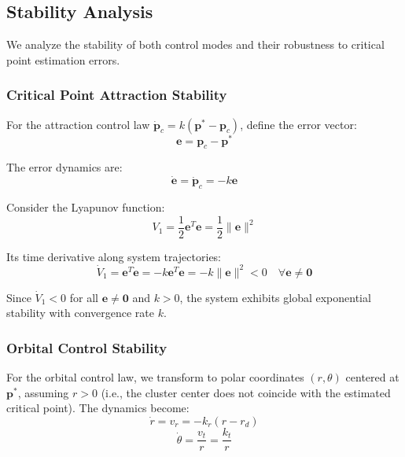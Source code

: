 \documentclass[lettersize,journal]{IEEEtran}
\begin{document}
\subsection{Stability Analysis}

We analyze the stability of both control modes and their robustness to critical point estimation errors.

\subsubsection{Critical Point Attraction Stability}

For the attraction control law $\dot{\mathbf{p}}_c = k(\mathbf{p}^* - \mathbf{p}_c)$, define the error vector:
\begin{equation}
\mathbf{e} = \mathbf{p}_c - \mathbf{p}^*
\end{equation}

The error dynamics are:
\begin{equation}
\dot{\mathbf{e}} = \dot{\mathbf{p}}_c = -k\mathbf{e}
\end{equation}

Consider the Lyapunov function:
\begin{equation}
V_1 = \frac{1}{2}\mathbf{e}^T\mathbf{e} = \frac{1}{2}\|\mathbf{e}\|^2
\end{equation}

Its time derivative along system trajectories:
\begin{equation}
\dot{V}_1 = \mathbf{e}^T\dot{\mathbf{e}} = -k\mathbf{e}^T\mathbf{e} = -k\|\mathbf{e}\|^2 < 0 \quad \forall \mathbf{e} \neq \mathbf{0}
\end{equation}

Since $\dot{V}_1 < 0$ for all $\mathbf{e} \neq \mathbf{0}$ and $k > 0$, the system exhibits global exponential stability with convergence rate $k$.

\subsubsection{Orbital Control Stability}

For the orbital control law, we transform to polar coordinates $(r, \theta)$ centered at $\mathbf{p}^*$, assuming $r > 0$ (i.e., the cluster center does not coincide with the estimated critical point). The dynamics become:
\begin{equation}
\dot{r} = v_r = -k_r(r - r_d)
\end{equation}
\begin{equation}
\dot{\theta} = \frac{v_t}{r} = \frac{k_t}{r}
\end{equation}
\end{document}
